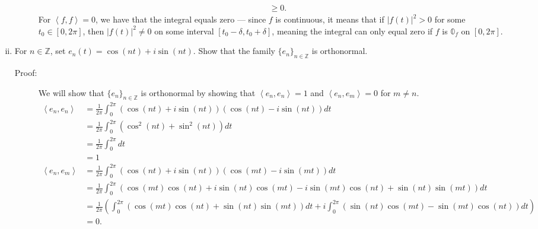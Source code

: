 \documentclass[9pt]{extarticle}
\newcommand{\Z}{\mathbb{Z}}
\newcommand{\iprod}[2]{\left\langle #1,#2\right\rangle}
\begin{document}
\begin{enumerate}[(i)]
\begin{description}
\begin{align*}
                         &\geq 0.
          \end{align*}
          For $\iprod{f}{f} = 0$, we have that the integral equals zero --- since $f$ is continuous, it means that if $|f(t)|^2 > 0$ for some $t_0\in [0,2\pi]$, then $|f(t)|^2 \neq 0$ on some interval $[t_0-\delta,t_0+\delta]$, meaning the integral can only equal zero if $f$ is $\mathbb{0}_f$ on $[0,2\pi]$.
      \end{description}
    \item For $n\in\Z$, set $e_n(t) = \cos(nt) + i\sin(nt)$. Show that the family $\{e_n\}_{n\in\Z}$ is orthonormal.
      \begin{description}
        \item[Proof:] We will show that $\{e_n\}_{n\in\Z}$ is orthonormal by showing that $\iprod{e_n}{e_n} = 1$ and $\iprod{e_n}{e_m} = 0$ for $m\neq n$.
          \begin{align*}
            \iprod{e_n}{e_n} &= \frac{1}{2\pi}\int_{0}^{2\pi}(\cos(nt) + i\sin(nt))(\cos(nt)-i\sin(nt))dt\\
                             &= \frac{1}{2\pi}\int_{0}^{2\pi}\left(\cos^{2}(nt) + \sin^{2}(nt)\right)dt\\
                             &= \frac{1}{2\pi}\int_{0}^{2\pi}dt\\
                             &= 1\\
            \iprod{e_n}{e_m} &= \frac{1}{2\pi}\int_{0}^{2\pi}(\cos(nt) + i\sin(nt))(\cos(mt) - i\sin(mt))dt\\
                             &= \frac{1}{2\pi}\int_{0}^{2\pi}\left(\cos(mt)\cos(nt) + i\sin(nt)\cos(mt) - i\sin(mt)\cos(nt) + \sin(nt)\sin(mt)\right)dt\\
                             &= \frac{1}{2\pi}\left(\int_{0}^{2\pi}(\cos(mt)\cos(nt) + \sin(nt)\sin(mt))dt + i\int_{0}^{2\pi}(\sin(nt)\cos(mt) - \sin(mt)\cos(nt))dt\right)\\
                             &= 0.
          \end{align*}
      \end{description}
  \end{enumerate}
\end{document}
